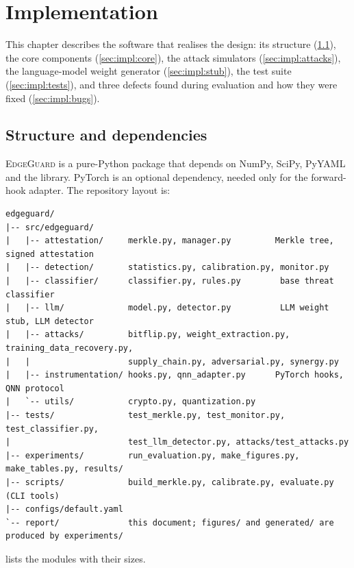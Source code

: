 \chapter{Implementation}
\label{ch:implementation}

This chapter describes the software that realises the design: its structure
(\cref{sec:impl:structure}), the core components (\cref{sec:impl:core}), the attack simulators
(\cref{sec:impl:attacks}), the language-model weight generator (\cref{sec:impl:stub}), the test
suite (\cref{sec:impl:tests}), and three defects found during evaluation and how they were fixed
(\cref{sec:impl:bugs}).

\section{Structure and dependencies}
\label{sec:impl:structure}

\textsc{EdgeGuard} is a pure-Python package that depends on NumPy, SciPy, PyYAML and the
 library. PyTorch is an optional dependency, needed only for the forward-hook
adapter. The repository layout is:

\begin{lstlisting}[language={},numbers=none,frame=single,basicstyle=\ttfamily\scriptsize]
edgeguard/
|-- src/edgeguard/
|   |-- attestation/     merkle.py, manager.py         Merkle tree, signed attestation
|   |-- detection/       statistics.py, calibration.py, monitor.py
|   |-- classifier/      classifier.py, rules.py        base threat classifier
|   |-- llm/             model.py, detector.py          LLM weight stub, LLM detector
|   |-- attacks/         bitflip.py, weight_extraction.py, training_data_recovery.py,
|   |                    supply_chain.py, adversarial.py, synergy.py
|   |-- instrumentation/ hooks.py, qnn_adapter.py      PyTorch hooks, QNN protocol
|   `-- utils/           crypto.py, quantization.py
|-- tests/               test_merkle.py, test_monitor.py, test_classifier.py,
|                        test_llm_detector.py, attacks/test_attacks.py
|-- experiments/         run_evaluation.py, make_figures.py, make_tables.py, results/
|-- scripts/             build_merkle.py, calibrate.py, evaluate.py   (CLI tools)
|-- configs/default.yaml
`-- report/              this document; figures/ and generated/ are produced by experiments/
\end{lstlisting}

 lists the modules with their sizes.

